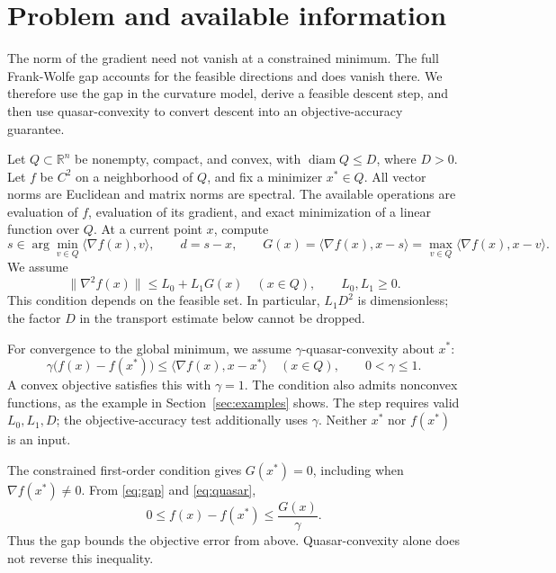 \section{Problem and available information}
The norm of the gradient need not vanish at a constrained minimum.
The full Frank-Wolfe gap accounts for the feasible directions and
does vanish there. We therefore use the gap in the curvature model,
derive a feasible descent step, and then use quasar-convexity to
convert descent into an objective-accuracy guarantee.

Let $Q\subset\mathbb R^n$ be nonempty, compact, and convex, with
$\operatorname{diam}Q\le D$, where $D>0$. Let $f$ be $C^2$ on a
neighborhood of $Q$, and fix a minimizer $x^*\in Q$.
All vector norms are Euclidean and matrix norms are spectral.
The available operations are evaluation of $f$, evaluation of its
gradient, and exact minimization of a linear function over $Q$.
At a current point $x$, compute
\begin{equation}\label{eq:gap}
 s\in\arg\min_{v\in Q}\langle\nabla f(x),v\rangle,\qquad
 d=s-x,\qquad
 G(x)=\langle\nabla f(x),x-s\rangle
     =\max_{v\in Q}\langle\nabla f(x),x-v\rangle.
\end{equation}
We assume
\begin{equation}\label{eq:gap_smoothness}
 \|\nabla^2f(x)\|\le L_0+L_1G(x)\quad(x\in Q),
 \qquad L_0,L_1\ge0.
\end{equation}
This condition depends on the feasible set. In particular,
$L_1D^2$ is dimensionless; the factor $D$ in the transport estimate
below cannot be dropped.

For convergence to the global minimum, we assume
$\gamma$-quasar-convexity about $x^*$:
\begin{equation}\label{eq:quasar}
 \gamma\bigl(f(x)-f(x^*)\bigr)
       \le\langle\nabla f(x),x-x^*\rangle\quad(x\in Q),
 \qquad 0<\gamma\le1.
\end{equation}
A convex objective satisfies this with $\gamma=1$. The condition
also admits nonconvex functions, as the example in Section~\ref{sec:examples}
shows. The step requires valid $L_0,L_1,D$; the objective-accuracy
test additionally uses $\gamma$. Neither $x^*$ nor $f(x^*)$ is an
input.

The constrained first-order condition gives $G(x^*)=0$, including
when $\nabla f(x^*)\ne0$. From \eqref{eq:gap} and \eqref{eq:quasar},
\begin{equation}\label{eq:certificate}
 0\le f(x)-f(x^*)\le \frac{G(x)}{\gamma}.
\end{equation}
Thus the gap bounds the objective error from above. Quasar-convexity
alone does not reverse this inequality.

